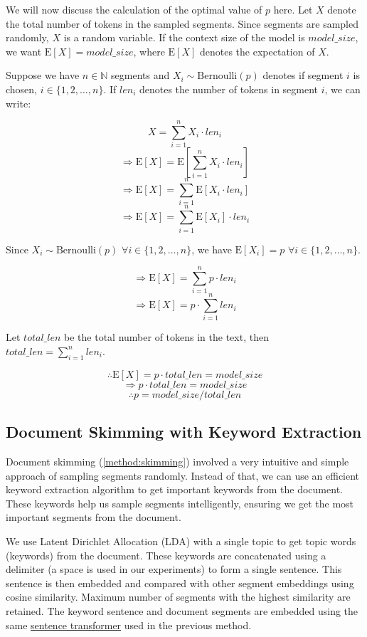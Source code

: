 We will now discuss the calculation of the optimal value of $p$ here.
Let $X$ denote the total number of tokens in the sampled segments.
Since segments are sampled randomly, $X$ is a random variable.
If the context size of the model is $model\_size$, we want $\mathrm{E}[X] = model\_size$,
where $\mathrm{E}[X]$ denotes the expectation of $X$.

Suppose we have $n \in \mathbb{N}$ segments and $X_i \sim \mathrm{Bernoulli}(p)$ denotes
if segment $i$ is chosen, $i \in \{1, 2, \dots, n\}$.
If $len_i$ denotes the number of tokens in segment $i$, we can write:

\[ X = \sum_{i = 1}^{n} X_i \cdot len_i \]
\[ \Rightarrow \mathrm{E}[X] = \mathrm{E}[\sum_{i = 1}^{n} X_i \cdot len_i] \]
\[ \Rightarrow \mathrm{E}[X] = \sum_{i = 1}^{n} \mathrm{E}[X_i \cdot len_i] \]
\[ \Rightarrow \mathrm{E}[X] = \sum_{i = 1}^{n} \mathrm{E}[X_i] \cdot len_i \]

Since $X_i \sim \mathrm{Bernoulli}(p)$ $\forall i \in \{1, 2, \dots, n\}$, we
have $\mathrm{E}[X_i] = p$ $\forall i \in \{1, 2, \dots, n\}$.

\[ \Rightarrow \mathrm{E}[X] = \sum_{i = 1}^{n} p \cdot len_i \]
\[ \Rightarrow \mathrm{E}[X] = p \cdot \sum_{i = 1}^{n} len_i \]

Let $total\_len$ be the total number of tokens in the text, then
$total\_len = \sum_{i = 1}^{n} len_i$.

\[ \therefore \mathrm{E}[X] = p \cdot total\_len = model\_size \]
\[ \Rightarrow p \cdot total\_len = model\_size \]
\[ \therefore p = model\_size / total\_len \]


\subsection{Document Skimming with Keyword Extraction}

Document skimming (\ref{method:skimming}) involved a very intuitive and simple
approach of sampling segments randomly.
Instead of that, we can use an efficient keyword extraction algorithm to get important keywords
from the document.
These keywords help us sample segments intelligently, ensuring we get the most important
segments from the document.

We use Latent Dirichlet Allocation (LDA) \cite{blei2003latent} with a single topic to get topic
words (keywords) from the document.
These keywords are concatenated using a delimiter (a space is used in our experiments) to form a
single sentence.
This sentence is then embedded and compared with other segment embeddings using cosine similarity.
Maximum number of segments with the highest similarity are retained.
The keyword sentence and document segments are embedded using the same
\href{https://huggingface.co/sentence-transformers/all-MiniLM-L6-v2}{sentence transformer}
used in the previous method.

